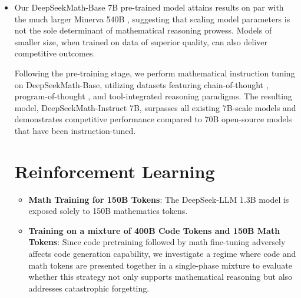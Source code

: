 \begin{itemize}[topsep=0pt]
\begin{abstract}
The intricacy and formal structure inherent in mathematical reasoning present formidable obstacles for language models. This work presents DeepSeekMath~7B, an advancement built upon continued pre-training of DeepSeek-Coder-Base-v1.5 7B using a dataset of 120B math-focused tokens derived from Common Crawl, as well as accompanying natural language and programming code resources. DeepSeekMath~7B attains a notable 51.7\% score on the MATH benchmark at competition level, doing so independently of external tool support or ensemble voting methods, thereby nearing the performance of Gemini-Ultra and GPT-4. Furthermore, by evaluating 64 samples, DeepSeekMath~7B achieves a self-consistency score of 60.9\% on the MATH benchmark. This substantial enhancement in mathematical reasoning is rooted in two main elements: firstly, the exploitation of vast quantities of openly available web material, systematically curated through an advanced data filtering pipeline; secondly, the development of Group Relative Policy Optimization (GRPO), an extension of Proximal Policy Optimization (PPO), which both elevates mathematical reasoning capabilities and streamlines PPO memory utilization.
\end{abstract}

    \item Our DeepSeekMath-Base 7B pre-trained model attains results on par with the much larger Minerva 540B \citep{minerva}, suggesting that scaling model parameters is not the sole determinant of mathematical reasoning prowess. Models of smaller size, when trained on data of superior quality, can also deliver competitive outcomes.

Following the pre-training stage, we perform mathematical instruction tuning on DeepSeekMath-Base, utilizing datasets featuring chain-of-thought \citep{cot}, program-of-thought \citep{pot,pal}, and tool-integrated reasoning \citep{tora} paradigms. The resulting model, DeepSeekMath-Instruct 7B, surpasses all existing 7B-scale models and demonstrates competitive performance compared to 70B open-source models that have been instruction-tuned.

\section{Reinforcement Learning}

\begin{itemize}[topsep=0pt]
    \item \textbf{Math Training for 150B Tokens}: The DeepSeek-LLM 1.3B model is exposed solely to 150B mathematics tokens.
    \item \textbf{Training on a mixture of 400B Code Tokens and 150B Math Tokens}: Since code pretraining followed by math fine-tuning adversely affects code generation capability, we investigate a regime where code and math tokens are presented together in a single-phase mixture to evaluate whether this strategy not only supports mathematical reasoning but also addresses catastrophic forgetting.
\end{itemize}


\end{itemize}
